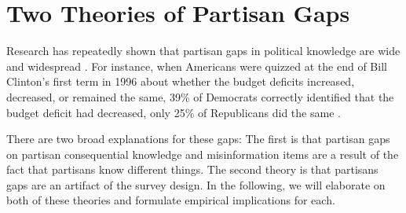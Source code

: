 \documentclass[12pt, letterpaper]{article}
\begin{document}
	\section*{Two Theories of Partisan Gaps}
	\label{sec:theory}
	
	Research has repeatedly shown that partisan gaps in political knowledge are wide and widespread \citep{bartels_2002, jerit2012partisan, lodgetaber_2013}. For instance, when Americans were quizzed at the end of Bill Clinton's first term in 1996 about whether the budget deficits increased, decreased, or remained the same, 39\% of Democrats correctly identified that the budget deficit had decreased, only 25\% of Republicans did the same \citep[280]{achen2016democracy}.
	
	
	There are two broad explanations for these gaps: The first is that partisan gaps on partisan consequential knowledge and misinformation items are a result of the fact that partisans know different things. The second theory is that partisans gaps are an artifact of the survey design. In the following, we will elaborate on both of these theories and formulate empirical implications for each.
	
	
	
	
\end{document}
